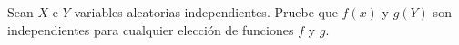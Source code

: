 \begin{statement}{12}
  Sean $X$ e $Y$ variables aleatorias independientes.
  Pruebe que $f(x)$ y $g(Y)$ son independientes para cualquier elecci\'on de funciones $f$ y $g$.
\end{statement}